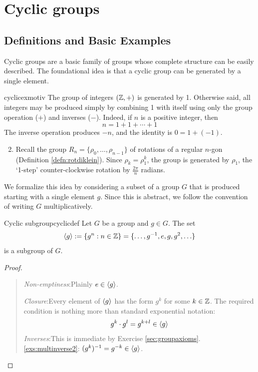 \graphicspath{{3cyclic/asy/}}

\section{Cyclic groups}\label{chap:cyclic}

\subsection{Definitions and Basic Examples}\label{sec:cycdef}


Cyclic groups are a basic family of groups whose complete structure can be easily described. The foundational idea is that a cyclic group can be generated by a single element.

\begin{examples}{}{cyclicexmotiv}
\exstart The group of integers $(\mathbb{Z},+)$ is generated by 1. Otherwise said, all integers may be produced simply by combining 1 with itself using only the group operation ($+$) and inverses ($-$). Indeed, if $n$ is a positive integer, then
  \[n=1+1+\cdots+1\]
  The inverse operation produces $-n$, and the identity is $0=1+(-1)$.
\begin{enumerate}\setcounter{enumi}{1}
 	\item Recall the group $R_n=\{\rho_0,\ldots,\rho_{n-1}\}$ of rotations of a regular $n$-gon (Definition \ref{defn:rotdiklein}). Since $\rho_k=\rho_1^k$, the group is generated by $\rho_1$, the `1-step' counter-clockwise rotation by $\frac{2\pi}n$ radians.
\end{enumerate}
\end{examples}

We formalize this idea by considering a subset of a group $G$ that is produced starting with a single element $g$. Since this is abstract, we follow the convention of writing $G$ multiplicatively.

\begin{lemm}{Cyclic subgroup}{cyclicdef}
Let $G$ be a group and $g\in G$. The set
\[\left\langle g\right\rangle:=\{g^n:n\in\mathbb{Z}\}=\{\ldots,g^{-1},e,g,g^2,\ldots\}\]
is a subgroup of $G$.
\end{lemm}

\begin{proof}
\begin{quote}
	\emph{Non-emptiness}:\quad Plainly $e\in\left\langle g\right\rangle$.\par
	\emph{Closure}:\quad Every element of $\left\langle g\right\rangle$ has the form $g^k$ for some $k\in \mathbb{Z}$. The required condition is nothing more than standard exponential notation:
	\[g^k\cdot g^l=g^{k+l}\in\left\langle g\right\rangle\]
	\emph{Inverses}:\quad This is immediate by Exercise \ref*{sec:groupaxioms}.\ref{exs:multinverse2}: $(g^k)^{-1}=g^{-k}\in\left\langle g\right\rangle$.\qedhere
\end{quote}
\end{proof}

